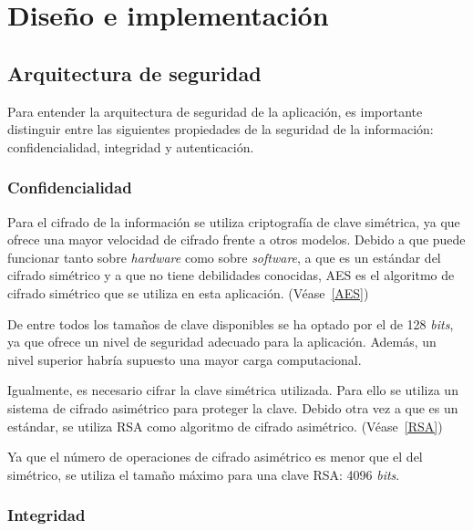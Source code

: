 
\chapter{Diseño e implementación} %

\label{Chapter4} %


\section{Arquitectura de seguridad}

Para entender la arquitectura de seguridad de la aplicación, es importante distinguir entre las siguientes propiedades de la seguridad de la información: confidencialidad, integridad y autenticación.

\subsection{Confidencialidad}

Para el cifrado de la información se utiliza criptografía de clave simétrica, ya que ofrece una mayor velocidad de cifrado frente a otros modelos. Debido a que puede funcionar tanto sobre \emph{hardware} como sobre \emph{software}, a que es un estándar del cifrado simétrico y a que no tiene debilidades conocidas, AES es el algoritmo de cifrado simétrico que se utiliza en esta aplicación. (Véase~\ref{AES})

De entre todos los tamaños de clave disponibles se ha optado por el de 128 \emph{bits}, ya que ofrece un nivel de seguridad adecuado para la aplicación. Además, un nivel superior habría supuesto una mayor carga computacional.

Igualmente, es necesario cifrar la clave simétrica utilizada. Para ello se utiliza un sistema de cifrado asimétrico para proteger la clave. Debido otra vez a que es un estándar, se utiliza RSA como algoritmo de cifrado asimétrico. (Véase~\ref{RSA})

Ya que el número de operaciones de cifrado asimétrico es menor que el del simétrico, se utiliza el tamaño máximo para una clave RSA: 4096 \emph{bits}.

\subsection{Integridad}

